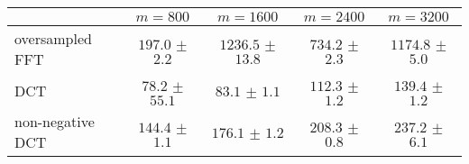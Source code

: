 \centering
\renewcommand{\arraystretch}{1.2}
\begin{tabular}{@{}lcccc@{}}
\toprule
 & $m=800$ & $m=1600$ & $m=2400$ & $m=3200$\\
\midrule
oversampled FFT & $197.0$ $\pm$ $2.2$ & $1236.5$ $\pm$ $13.8$ & $734.2$ $\pm$ $2.3$ & $1174.8$ $\pm$ $5.0$ \\
DCT & $78.2$ $\pm$ $55.1$ & $83.1$ $\pm$ $1.1$ & $112.3$ $\pm$ $1.2$ & $139.4$ $\pm$ $1.2$ \\
non-negative DCT & $144.4$ $\pm$ $1.1$ & $176.1$ $\pm$ $1.2$ & $208.3$ $\pm$ $0.8$ & $237.2$ $\pm$ $6.1$ \\
\bottomrule
\end{tabular}

